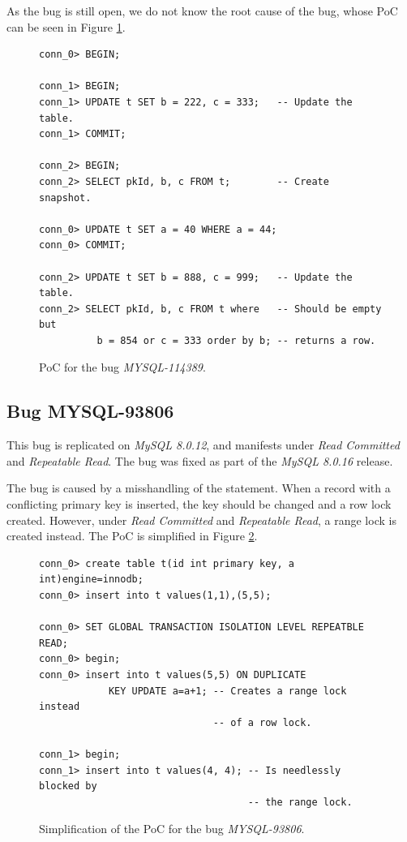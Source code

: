 As the bug is still open, we do not know the root cause of the bug, whose PoC can be seen in Figure \ref{fig:MYSQL-114389}.

\begin{figure}[H]
\begin{verbatim}
conn_0> BEGIN;

conn_1> BEGIN;                          
conn_1> UPDATE t SET b = 222, c = 333;   -- Update the table.
conn_1> COMMIT;                         

conn_2> BEGIN;
conn_2> SELECT pkId, b, c FROM t;        -- Create snapshot.

conn_0> UPDATE t SET a = 40 WHERE a = 44;
conn_0> COMMIT;

conn_2> UPDATE t SET b = 888, c = 999;   -- Update the table.
conn_2> SELECT pkId, b, c FROM t where   -- Should be empty but
          b = 854 or c = 333 order by b; -- returns a row.

\end{verbatim}
\caption{PoC for the bug \textit{MYSQL-114389}.} \label{fig:MYSQL-114389}
\end{figure}


\subsection*{Bug MYSQL-93806}

This bug is replicated on \textit{MySQL 8.0.12}, and manifests under \textit{Read Committed} and \textit{Repeatable Read}. The bug was fixed as part of the \textit{MySQL 8.0.16} release.

The bug is caused by a misshandling of the  statement. When a record with a conflicting primary key is inserted, the key should be changed and a row lock created. However, under \textit{Read Committed} and \textit{Repeatable Read}, a range lock is created instead. The PoC is simplified in Figure \ref{fig:MYSQL-93806}.

\begin{figure}[H]
\begin{verbatim}
conn_0> create table t(id int primary key, a int)engine=innodb;
conn_0> insert into t values(1,1),(5,5);

conn_0> SET GLOBAL TRANSACTION ISOLATION LEVEL REPEATBLE READ;
conn_0> begin;
conn_0> insert into t values(5,5) ON DUPLICATE
            KEY UPDATE a=a+1; -- Creates a range lock instead
                              -- of a row lock.

conn_1> begin;
conn_1> insert into t values(4, 4); -- Is needlessly blocked by
                                    -- the range lock.
\end{verbatim}
\caption{Simplification of the PoC for the bug \textit{MYSQL-93806}.} \label{fig:MYSQL-93806}
\end{figure}


